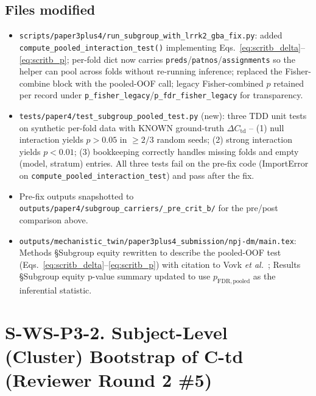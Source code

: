 \documentclass[11pt]{article}
\begin{document}
\subsection*{Files modified}

\begin{itemize}\itemsep=0.2em
  \item \texttt{scripts/paper3plus4/run\_subgroup\_with\_lrrk2\_gba\_fix.py}: added \texttt{compute\_pooled\_interaction\_test()} implementing Eqs.~\ref{eq:scritb_delta}--\ref{eq:scritb_p}; per-fold dict now carries \texttt{preds}/\texttt{patnos}/\texttt{assignments} so the helper can pool across folds without re-running inference; replaced the Fisher-combine block with the pooled-OOF call; legacy Fisher-combined $p$ retained per record under \texttt{p\_fisher\_legacy}/\texttt{p\_fdr\_fisher\_legacy} for transparency.
  \item \texttt{tests/paper4/test\_subgroup\_pooled\_test.py} (new): three TDD unit tests on synthetic per-fold data with KNOWN ground-truth $\Delta C_\mathrm{td}$ -- (1) null interaction yields $p>0.05$ in $\ge 2/3$ random seeds; (2) strong interaction yields $p<0.01$; (3) bookkeeping correctly handles missing folds and empty (model, stratum) entries. All three tests fail on the pre-fix code (ImportError on \texttt{compute\_pooled\_interaction\_test}) and pass after the fix.
  \item Pre-fix outputs snapshotted to \texttt{outputs/paper4/subgroup\_carriers/\_pre\_crit\_b/} for the pre/post comparison above.
  \item \texttt{outputs/mechanistic\_twin/paper3plus4\_submission/npj-dm/main.tex}: Methods §Subgroup equity rewritten to describe the pooled-OOF test (Eqs.~\ref{eq:scritb_delta}--\ref{eq:scritb_p}) with citation to Vovk \emph{et al.}~\cite{vovk2022conformal}; Results §Subgroup equity p-value summary updated to use $p_\mathrm{FDR,pooled}$ as the inferential statistic.
\end{itemize}


\section*{S-WS-P3-2. Subject-Level (Cluster) Bootstrap of C-td (Reviewer Round 2 \#5)}
\end{document}
